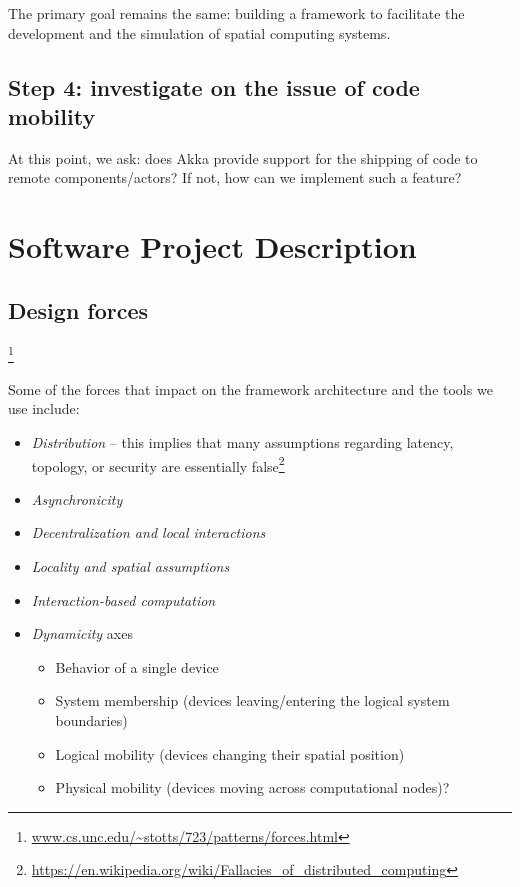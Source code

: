 \documentclass[11pt]{llncs}
\begin{document}
The primary goal remains the same: building a framework to facilitate the development and the simulation of spatial computing systems.

\subsection*{Step 4: investigate on the issue of code mobility}

At this point, we ask: does Akka provide support for the shipping of code to remote components/actors? If not, how can we implement such a feature?

\newpage

\section{Software Project Description}



\subsection{Design forces}

 \footnote{\url{www.cs.unc.edu/~stotts/723/patterns/forces.html}}

Some of the forces that impact on the framework architecture and the tools we use include:

\begin{itemize}
 \item \emph{Distribution} -- this implies that many assumptions regarding latency, topology, or security are essentially false\footnote{\url{https://en.wikipedia.org/wiki/Fallacies_of_distributed_computing}}
 \item \emph{Asynchronicity}
 \item \emph{Decentralization and local interactions}
 \item \emph{Locality and spatial assumptions}
 \item \emph{Interaction-based computation}
 \item \emph{Dynamicity} axes
 		\begin{itemize}
 		\item Behavior of a single device
 		\item System membership (devices leaving/entering the logical system boundaries)
 		\item Logical mobility (devices changing their spatial position)
 		\item Physical mobility (devices moving across computational nodes)?
 		\end{itemize}
\end{itemize}
\end{document}
